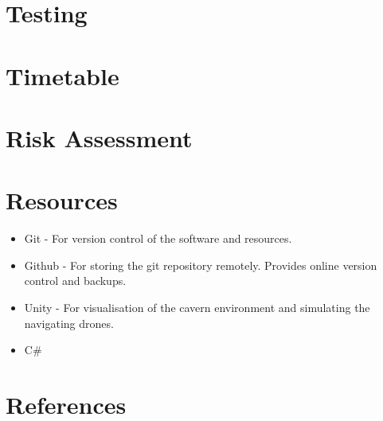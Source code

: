 \documentclass{article}
\begin{document}
\section{Testing}

\section{Timetable}

\section{Risk Assessment}

\section{Resources}

\begin{itemize}
    \item Git - For version control of the software and resources.
    \item Github - For storing the git repository remotely. Provides online version control and backups.
    \item Unity - For visualisation of the cavern environment and simulating the navigating drones.
    \item C#
\end{itemize}

\section{References}
\end{document}
